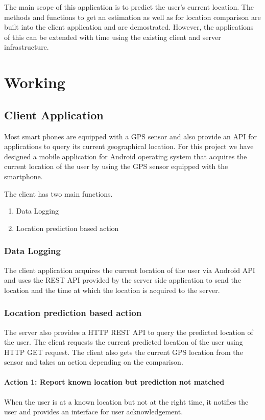 \documentclass[conference]{IEEEtran}
\begin{document}
The main scope of this application is to predict the user's current location. The methods and functions to get an estimation as well as for location comparison are built into the client application and are demostrated. However, the applications of this can be extended with time using the existing client and server infrastructure.

\section{Working}

\subsection{Client Application}
Most smart phones are equipped with a GPS sensor and also provide an API for applications to query its current geographical location. For this project we have designed a mobile application for Android operating system that acquires the current location of the user by using the GPS sensor equipped with the smartphone.

The client has two main functions.
\begin{enumerate}
  \item Data Logging
  \item Location prediction based action
\end{enumerate}

\subsubsection{Data Logging}
The client application acquires the current location of the user via Android API and uses the REST API provided by the server side application to send the location and the time at which the location is acquired to the server.

\subsubsection{Location prediction based action}
The server also provides a HTTP REST API to query the predicted location of the user. The client requests the current predicted location of the user using HTTP GET request. The client also gets the current GPS location from the sensor and takes an action depending on the comparison.

\paragraph{Action 1: Report known location but prediction not matched}
When the user is at a known location but not at the right time, it notifies the user and provides an interface for user acknowledgement.
\end{document}
